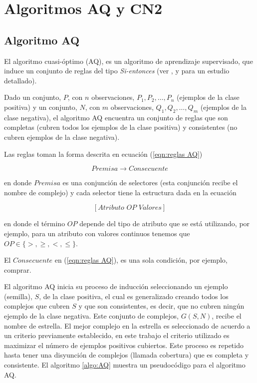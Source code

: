 \documentclass[12pt]{scrbook}
\theoremstyle{break}
\theoremstyle{break}
\begin{document}
\section{Algoritmos AQ y CN2}
\label{seccion:algoritmos aq cn2}

\subsection{Algoritmo AQ}
\label{subseccion:algoritmo aq}
El algoritmo cuasi-óptimo (AQ), es un algoritmo de aprendizaje supervisado, que induce un conjunto de reglas del tipo \textit{Si-entonces} (ver \cite{AQCervone2010}, \cite{AQMichalski1991} y \cite{AQWojtusiak2012} para un estudio detallado). 

Dado un conjunto, $P$, con $n$ observaciones, $P_1, P_2, \ldots, P_n$ (ejemplos de la clase positiva)  y un conjunto, $N$, con $m$ observaciones, $Q_1, Q_2, \ldots, Q_m$ (ejemplos de la clase negativa), el algoritmo AQ encuentra un conjunto de reglas que son completas (cubren todos los ejemplos de la clase positiva) y consistentes (no cubren ejemplos de la clase negativa).

Las reglas toman la forma descrita en ecuación (\ref{eqn:reglas AQ})

\begin{equation} \label{eqn:reglas AQ}
Premisa \rightarrow Consecuente
\end{equation}

en donde $Premisa$ es una conjunción de selectores (esta conjunción recibe el nombre de complejo) y cada selector tiene la estructura dada en la ecuación 

\begin{equation} \label{eqn:condicion AQ}
\left[Atributo\,\, OP\,\, Valores \right]
\end{equation}

en donde el término $OP$ depende del tipo de atributo que se está utilizando, por ejemplo, para un atributo con valores continuos tenemos que $OP \in \{>, \geq, <, \leq\}$.

El $Consecuente$ en (\ref{eqn:reglas AQ}), es una sola condición, por ejemplo, comprar.

El algoritmo AQ inicia su proceso de inducción seleccionando un ejemplo (semilla), $S$, de la clase positiva, el cual es generalizado creando todos los complejos que cubren $S$ y que son consistentes, es decir, que no cubren ningún ejemplo de la clase negativa. Este conjunto de complejos, $G(S,N)$, recibe el nombre de estrella. El mejor complejo en la estrella es seleccionado de acuerdo a un criterio previamente establecido, en este trabajo el criterio utilizado es maximizar el número de ejemplos positivos cubiertos. Este proceso es repetido hasta tener una disyunción de complejos (llamada cobertura) que es completa y consistente. El algoritmo \ref{algo:AQ} muestra un pseudocódigo para el algoritmo AQ.
\end{document}
